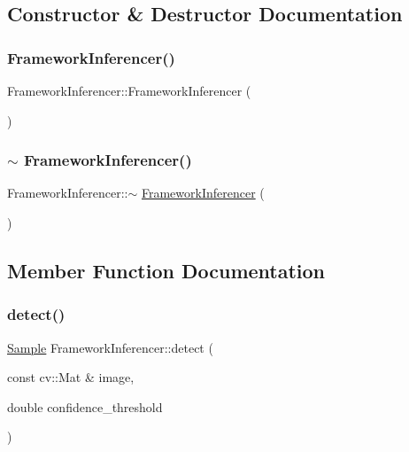 \subsection{Constructor \& Destructor Documentation}
\mbox{\label{class_framework_inferencer_adda91b1e8b6238e4cd3cc18e84675fea}} 
\subsubsection{\texorpdfstring{Framework\+Inferencer()}{FrameworkInferencer()}}
{\footnotesize\ttfamily Framework\+Inferencer\+::\+Framework\+Inferencer (\begin{DoxyParamCaption}{ }\end{DoxyParamCaption})}

\mbox{\label{class_framework_inferencer_a0a0ad89131a1f2a2377a3003b0c1d319}} 
\subsubsection{\texorpdfstring{$\sim$ Framework\+Inferencer()}{~ FrameworkInferencer()}}
{\footnotesize\ttfamily Framework\+Inferencer\+::$\sim$ \hyperlink{class_framework_inferencer}{Framework\+Inferencer} (\begin{DoxyParamCaption}{ }\end{DoxyParamCaption})}



\subsection{Member Function Documentation}
\mbox{\label{class_framework_inferencer_a4c2b3b0ec03df5f97e7b32235422dc60}} 
\subsubsection{\texorpdfstring{detect()}{detect()}}
{\footnotesize\ttfamily \hyperlink{struct_sample}{Sample} Framework\+Inferencer\+::detect (\begin{DoxyParamCaption}\item[{const cv\+::\+Mat \&}]{image,  }\item[{double}]{confidence\+\_\+threshold }\end{DoxyParamCaption})}

